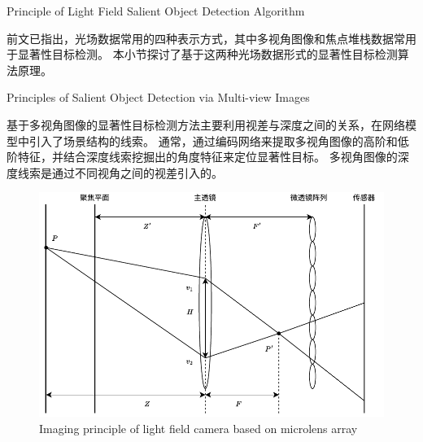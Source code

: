 %
%
%
%
%
%
%
%
%
%
%


{Principle of Light Field Salient Object Detection Algorithm}

%
%
%
%
%
%
前文已指出，光场数据常用的四种表示方式，其中多视角图像和焦点堆栈数据常用于显著性目标检测。
本小节探讨了基于这两种光场数据形式的显著性目标检测算法原理。

%
%





{Principles of Salient Object Detection via Multi-view Images}


基于多视角图像的显著性目标检测方法主要利用视差与深度之间的关系，在网络模型中引入了场景结构的线索。
通常，通过编码网络来提取多视角图像的高阶和低阶特征，并结合深度线索挖掘出的角度特征来定位显著性目标。
多视角图像的深度线索是通过不同视角之间的视差引入的。

\begin{figure}[b]
	\centering
	\includegraphics[width=0.80\linewidth]{figures/chapter2/microlens_array_imaging.drawio}
	{Imaging principle of light field camera based on microlens array}  
	\label{cpt2_fig8:multi_array}
\end{figure}


